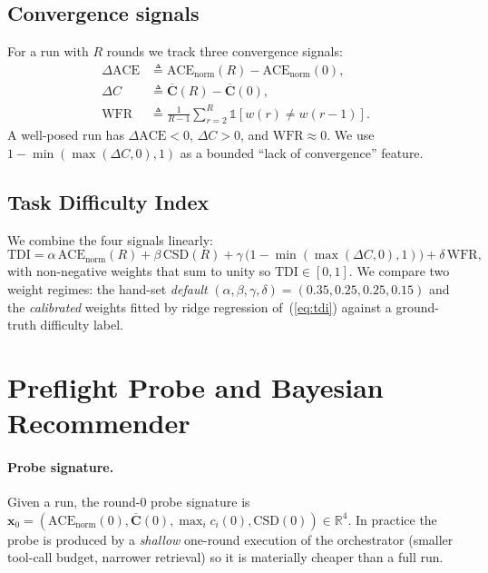\documentclass[10pt,a4paper]{article}
\begin{document}
\subsection{Convergence signals}

For a run with $R$ rounds we track three convergence signals:
\begin{align}
  \Delta\mathrm{ACE}     &\triangleq \mathrm{ACE}_{\mathrm{norm}}(R) - \mathrm{ACE}_{\mathrm{norm}}(0), \\
  \Delta C               &\triangleq \overline{\mathbf{C}}(R) - \overline{\mathbf{C}}(0), \\
  \mathrm{WFR}           &\triangleq \frac{1}{R-1} \sum_{r=2}^{R} \mathbb{1}\!\left[w(r) \neq w(r-1)\right].
\end{align}
A well-posed run has $\Delta\mathrm{ACE}\!<\!0$, $\Delta C\!>\!0$, and
$\mathrm{WFR}\!\approx\!0$. We use $1-\min(\max(\Delta C,0),1)$ as a
bounded ``lack of convergence'' feature.

\subsection{Task Difficulty Index}

We combine the four signals linearly:
\begin{equation}
  \mathrm{TDI} = \alpha\,\mathrm{ACE}_{\mathrm{norm}}(R)
               + \beta\,\mathrm{CSD}(R)
               + \gamma\,\bigl(1 - \min(\max(\Delta C, 0), 1)\bigr)
               + \delta\,\mathrm{WFR},
  \label{eq:tdi}
\end{equation}
with non-negative weights that sum to unity so $\mathrm{TDI}\!\in\![0,1]$. We
compare two weight regimes: the hand-set \emph{default}
$(\alpha,\beta,\gamma,\delta)=(0.35,0.25,0.25,0.15)$ and the \emph{calibrated}
weights fitted by ridge regression of~(\ref{eq:tdi}) against a ground-truth
difficulty label.

\section{Preflight Probe and Bayesian Recommender}\label{sec:probe}

\paragraph{Probe signature.} Given a run, the round-$0$ probe signature is
$\mathbf{x}_0 = (\mathrm{ACE}_{\mathrm{norm}}(0), \overline{\mathbf{C}}(0),
\max_i c_i(0), \mathrm{CSD}(0)) \in \mathbb{R}^4$. In practice the probe is
produced by a \emph{shallow} one-round execution of the orchestrator (smaller
tool-call budget, narrower retrieval) so it is materially cheaper than a full
run.
\end{document}
